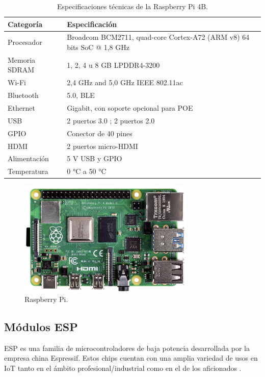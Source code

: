 \begin{table}[h]
\centering
\caption[Especificaciones técnicas de la Raspberry Pi 4B.]{Especificaciones técnicas de la Raspberry Pi 4B.}

\begin{tabular}{p{3cm} p{8cm}} 
\toprule
\textbf{Categoría} & \textbf{Especificación}\\

\midrule
Procesador	& Broadcom BCM2711, quad-core Cortex-A72 (ARM v8) 64 bits SoC @ 1,8 GHz \\
Memoria SDRAM	 & 1, 2, 4 u 8 GB LPDDR4-3200 \\
Wi-Fi	& 2,4 GHz and 5,0 GHz IEEE 802.11ac \\
Bluetooth	&  5.0, BLE \\
Ethernet	& Gigabit, con soporte opcional para POE\\
USB	& 2 puertos  3.0 ; 2 puertos 2.0\\
GPIO	&	Conector de 40 pines\\
HDMI	&  2 puertos micro-HDMI\\
Alimentación	& 5 V USB y GPIO\\
Temperatura	& 0 °C a 50 °C \\
\bottomrule
\hline
\end{tabular}
\label{tab:raspberrypi}
\end{table}
 
\begin{figure}[h]
	\centering
	\includegraphics[width=0.75\textwidth]{./Figures/rpi.png}
	\caption[Raspberry Pi.]{Raspberry Pi\protect\footnotemark.}
	\label{fig:rpi}
\end{figure}

\subsection{Módulos ESP}
\label{sec:Módulos ESP}
ESP es una familia de microcontroladores de baja potencia  desarrollada por la empresa china Espressif. Estos chips cuentan con una amplia variedad de usos en IoT tanto en el ámbito profesional/industrial como en el de los aficionados \citep{esp32} \citep{esp8266}. 

